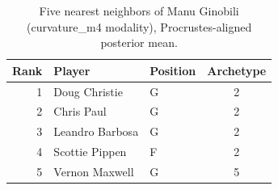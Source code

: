 \begin{table}[htbp]
  \centering\small
  \begin{tabular}{rllc}
    \toprule
    Rank & Player & Position & Archetype \\
    \midrule
    1 & Doug Christie & G & 2 \\
    2 & Chris Paul & G & 2 \\
    3 & Leandro Barbosa & G & 2 \\
    4 & Scottie Pippen & F & 2 \\
    5 & Vernon Maxwell & G & 5 \\
    \bottomrule
  \end{tabular}
  \caption{Five nearest neighbors of Manu Ginobili (curvature_m4 modality), Procrustes-aligned posterior mean.}
  \label{tab:Manu_Ginobili_neighbors_curvature_m4}
\end{table}

